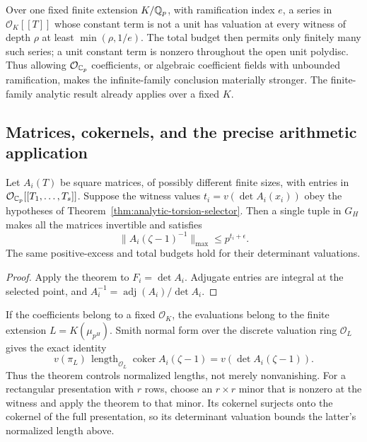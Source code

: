 
\begin{remark}
Over one fixed finite extension $K/\mathbb Q_p$, with ramification index $e$,
a series in $\mathcal O_K[[T]]$ whose constant term is not a unit has
valuation at every witness of depth $\rho$ at least
$\min(\rho,1/e)$. The total budget then permits only finitely many
such series; a unit constant term is nonzero throughout the open unit
polydisc. Thus allowing $\mathcal O_{\mathbb C_p}$ coefficients, or algebraic
coefficient fields with unbounded ramification, makes the
infinite-family conclusion materially stronger. The finite-family
analytic result already applies over a fixed $K$.
\end{remark}

\subsection{Matrices, cokernels, and the precise arithmetic application}

\begin{corollary}
\label{cor:torsion-matrices}
Let $A_i(T)$ be square matrices, of possibly different finite sizes,
with entries in $\mathcal O_{\mathbb C_p}[[T_1,\ldots,T_s]]$. Suppose the
witness values
$t_i=v(\det A_i(x_i))$ obey the hypotheses of
Theorem~\ref{thm:analytic-torsion-selector}. Then a single tuple in
$G_H$ makes all the matrices invertible and satisfies
\[
 \|A_i(\zeta-1)^{-1}\|_{\max}\le p^{t_i+\epsilon}.
\]
The same positive-excess and total budgets hold for their determinant
valuations.
\end{corollary}

\begin{proof}
Apply the theorem to $F_i=\det A_i$. Adjugate entries are integral at
the selected point, and
$A_i^{-1}=\operatorname{adj}(A_i)/\det A_i$.
\end{proof}

If the coefficients belong to a fixed $\mathcal O_K$, the evaluations
belong to the finite extension $L=K(\mu_{p^H})$. Smith normal form
over the discrete valuation ring $\mathcal O_L$ gives the exact identity
\[
 v(\pi_L)\,\operatorname{length}_{\mathcal O_L}
      \operatorname{coker}A_i(\zeta-1)
 =v(\det A_i(\zeta-1)).
\]
Thus the theorem controls normalized lengths, not merely
nonvanishing. For a rectangular presentation with $r$ rows, choose an
$r\times r$ minor that is nonzero at the witness and apply the theorem
to that minor. Its cokernel surjects onto the cokernel of the full
presentation, so its determinant valuation bounds the latter's
normalized length above.

